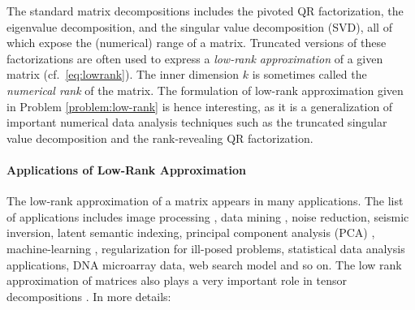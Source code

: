 \documentclass[12pt]{article}
\begin{document}
The standard matrix decompositions includes the pivoted QR
factorization, the eigenvalue decomposition, and the singular value
decomposition (SVD), all of which expose the (numerical) range of a
matrix. Truncated versions of these factorizations are often used to
express a \emph{low-rank approximation} of a given matrix (cf.~\eqref{eq:lowrank}).
The inner dimension $k$ is sometimes called the \emph{numerical rank} of the matrix.
The formulation of low-rank approximation given in Problem \ref{problem:low-rank} is hence interesting, as it is a generalization of important numerical data analysis techniques such as the truncated singular value decomposition and the rank-revealing QR factorization.

\paragraph{Applications of Low-Rank Approximation}
The low-rank approximation of a matrix appears in many applications. The list of applications includes image processing \cite{FriedMehr}, data mining \cite{Elden,skillicorn}, noise reduction, seismic inversion, latent semantic indexing, principal component analysis (PCA) \cite{pcabook,eldenpark}, machine-learning \cite{leekim,murphy,jye}, regularization for ill-posed problems, statistical data analysis applications, DNA microarray data, web search model and so on. The low rank approximation of matrices also plays a very important role in tensor decompositions \cite{espigkumarjan,larsgras,boris1,boris2,boris3,boris4,lathauver,oseledets}. In more details:

\end{document}
